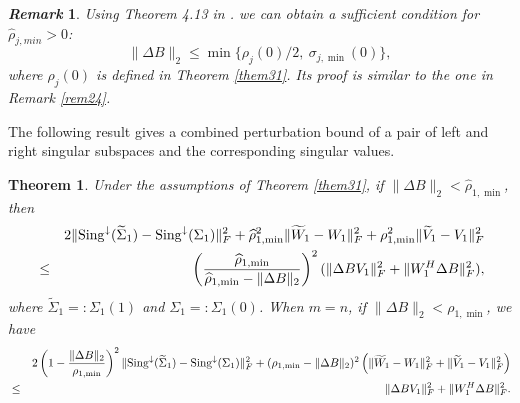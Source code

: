 \documentclass[11pt,a4paper]{article}
\numberwithin{equation}{section}
\newtheorem{Theorem}{Theorem}[section]
\newtheorem{Remark}{{\it Remark}}[section]
\newcommand {\wh} {\widehat}
\newcommand {\wt} {\widetilde}
\begin{document}
\begin{Remark}Using Theorem 4.13 in \cite[Chapter IV]{ss90}. we can obtain a sufficient condition for $\wh \rho_{j,min}>0$:
$$
\|\Delta B\|_2\leq \min\{\rho_j(0)/2,~\sigma_{j,\min}(0)\},
$$
where $\rho_j(0)$ is defined in Theorem \ref{them31}. Its proof is similar to the one in Remark \ref{rem24}.
\end{Remark}

\medskip

The following result gives a combined perturbation bound of a pair of left and right singular subspaces and the corresponding singular values.

\medskip

\begin{Theorem}\label{them32}
Under the assumptions of Theorem \ref{them31}, if $\|\Delta B\|_2<\wh \rho_{1,\min}$,  then
{\footnotesize \begin{eqnarray}\label{c-3-14-2}
&&2\|{{\rm Sing}^{\downarrow}(\wt\Sigma_1)-{\rm Sing}^{\downarrow}(\Sigma_1)}\|_F^2+\wh \rho_{1,\min}^2\|{\wt W_1-W_1}\|_F^2+
\rho_{1,\min}^2\|{\wt V_1-V_1}\|_F^2\nonumber\\
&\le&
\left(\frac{\wh \rho_{1,\min}}{\wh \rho_{1,\min}-\|{\Delta B}\|_2}\right)^2(\|{\Delta BV_1}\|_F^2+\|{W_1^H\Delta B}\|_F^2),
\end{eqnarray}}
where $\wt \Sigma_1=:\Sigma_1(1)$ and $\Sigma_1=:\Sigma_1(0)$.
When $m=n$, if  $\|\Delta B\|_2<\rho_{1,\min}$, we have
{\footnotesize\begin{eqnarray}\label{c-3-14-3}
&&2\left(1-\frac{\|\Delta B\|_2}{\rho_{1,\min}}\right)^2
\|{{\rm Sing}^{\downarrow}(\wt \Sigma_1)-{\rm Sing}^{\downarrow}(\Sigma_1)}\|_F^2+ (\rho_{1,\min}-\|\Delta B\|_2)^2\left(\|{\wt W_1- W_1}\|_F^2+
\|{\wt V_1-V_1}\|_F^2\right)\nonumber\\
& \le& \|{\Delta B V_1}\|_F^2+\|{W_1^H\Delta B}\|_F^2.
\end{eqnarray}}
\end{Theorem}

\medskip
\end{document}

